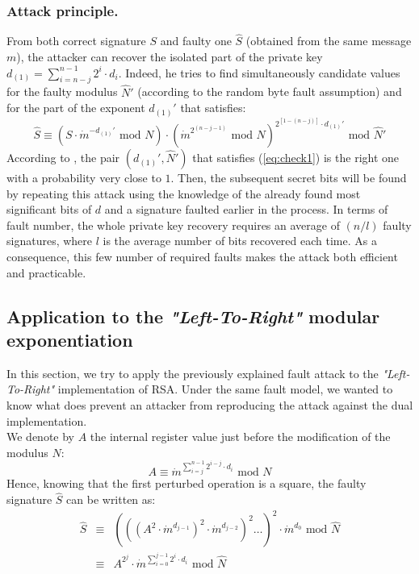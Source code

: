 \documentclass{article}
\begin{document}
\subsubsection{Attack principle.}
From both correct signature $S$ and faulty one $\hat{S}$ (obtained
from the same message $m$), the attacker can recover the isolated part
of the private key $d_{(1)} = \sum_{i=n-j}^{n-1} 2^{i} \cdot
{d_i}$. Indeed, he tries to find simultaneously candidate values for
the faulty modulus $\hat{N}'$ (according to the random byte fault
assumption) and for the part of the exponent $d_{(1)}'$ that
satisfies:
\begin{equation}
\label{eq:check1}
 \hat{S} \equiv \left( S \cdot \dot{m}^{-d_{(1)}'} \mbox{ mod }N \right) \cdot 
		\left(\dot{m}^{2^{(n-j-1)}} \mbox{ mod } N \right)^{2^{[1-(n-j)]} \cdot 
		d_{(1)}'} \mbox{ mod } \hat{N}'
\end{equation}
According to \cite{77}, the pair $(d_{(1)}',\hat{N}')$ that satisfies (\ref{eq:check1}) is the right one with a probability very close to $1$. Then, the subsequent secret bits will be found by repeating this attack using the knowledge of the already found most significant bits of $d$ and a signature faulted earlier in the process. In terms of fault number, the whole private key recovery requires an average of $\left( n/l \right)$ faulty signatures, where $l$ is the average number of bits recovered each time. As a consequence, this few number of required faults makes the attack both efficient and practicable.

\subsection{Application to the \textit{"Left-To-Right"} modular exponentiation}
\label{sec:l2r_mod_exp}
In this section, we try to apply the previously explained fault attack to the \textit{"Left-To-Right"} implementation of RSA. Under the same fault model, we wanted to know what does prevent an attacker from reproducing the attack against the dual implementation.\\
\indent 
We denote by $A$ the internal register value just before the modification of the modulus $N$:
\begin{equation}
 A \equiv \dot{m}^{\sum_{i=j}^{n-1} 2^{i-j} \cdot d_i} \mbox{ mod } N
\end{equation}
Hence, knowing that the first perturbed operation is a square, the faulty signature $\hat{S}$ can be written as:
\begin{eqnarray}
\label{eq:base_eq}
 \hat{S} & \equiv & \left( \left( \left(A^2 \cdot \dot{m}^{d_{j-1}} \right)^2 
		    \cdot \dot{m}^{d_{j-2}} \right)^2 \ldots \right)^2 
		    \cdot \dot{m}^{d_{0}} \mbox{ mod } \hat{N}\\ \nonumber
	 & \equiv & A^{2^{j}} \cdot \dot{m}^{\sum_{i=0}^{j-1} 2^i \cdot d_i} \mbox{ mod } \hat{N}
\end{eqnarray}
\end{document}
